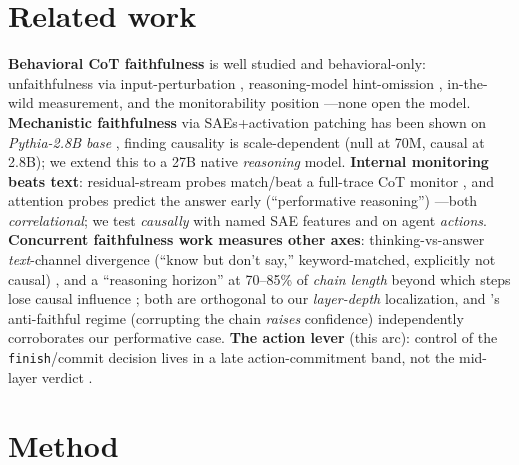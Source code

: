 \documentclass[11pt]{article}
\begin{document}
\section{Related work}
\textbf{Behavioral CoT faithfulness} is well studied and behavioral-only: unfaithfulness via input-perturbation
\cite{turpin2023}, reasoning-model hint-omission \cite{anthropic2025}, in-the-wild measurement, and the
monitorability position \cite{cotmon2025}---none open the model. \textbf{Mechanistic faithfulness} via
SAEs+activation patching has been shown on \emph{Pythia-2.8B base} \cite{chen2025}, finding causality is
scale-dependent (null at 70M, causal at 2.8B); we extend this to a 27B native \emph{reasoning} model.
\textbf{Internal monitoring beats text}: residual-stream probes match/beat a full-trace CoT monitor
\cite{mirtaheri2026}, and attention probes predict the answer early (``performative reasoning'')
\cite{goodfire2026}---both \emph{correlational}; we test \emph{causally} with named SAE features and on agent
\emph{actions}. \textbf{Concurrent faithfulness work measures other axes}: thinking-vs-answer \emph{text}-channel
divergence (``know but don't say,'' keyword-matched, explicitly not causal) \cite{young2026}, and a ``reasoning
horizon'' at 70--85\% of \emph{chain length} beyond which steps lose causal influence \cite{ye2026}; both are
orthogonal to our \emph{layer-depth} localization, and \cite{ye2026}'s anti-faithful regime (corrupting the chain
\emph{raises} confidence) independently corroborates our performative case. \textbf{The action lever} (this arc): control of the \texttt{finish}/commit decision lives in a
late action-commitment band, not the mid-layer verdict \cite{leverlate,levergen}.

\section{Method}\label{sec:method}
\end{document}
